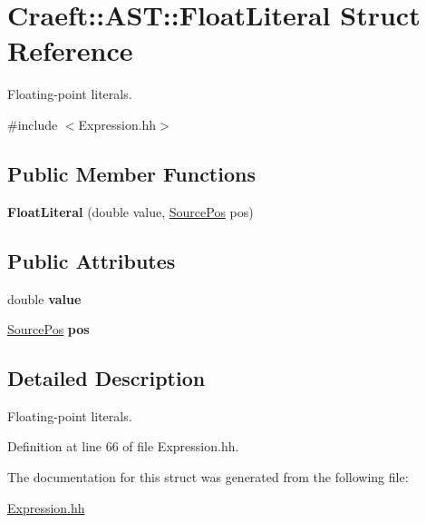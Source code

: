\hypertarget{struct_craeft_1_1_a_s_t_1_1_float_literal}{}\section{Craeft\+:\+:A\+ST\+:\+:Float\+Literal Struct Reference}
\label{struct_craeft_1_1_a_s_t_1_1_float_literal}


Floating-\/point literals.  




{\ttfamily \#include $<$Expression.\+hh$>$}

\subsection*{Public Member Functions}
\begin{DoxyCompactItemize}
\item 
\hypertarget{struct_craeft_1_1_a_s_t_1_1_float_literal_a2148f616f0df8fa9e9f947efc0ea6480}{}\label{struct_craeft_1_1_a_s_t_1_1_float_literal_a2148f616f0df8fa9e9f947efc0ea6480} 
{\bfseries Float\+Literal} (double value, \hyperlink{struct_craeft_1_1_source_pos}{Source\+Pos} pos)
\end{DoxyCompactItemize}
\subsection*{Public Attributes}
\begin{DoxyCompactItemize}
\item 
\hypertarget{struct_craeft_1_1_a_s_t_1_1_float_literal_abfdc3f38d5f64c213ad507d55fee550d}{}\label{struct_craeft_1_1_a_s_t_1_1_float_literal_abfdc3f38d5f64c213ad507d55fee550d} 
double {\bfseries value}
\item 
\hypertarget{struct_craeft_1_1_a_s_t_1_1_float_literal_a221cba0856d46d03f6da874e4a79f679}{}\label{struct_craeft_1_1_a_s_t_1_1_float_literal_a221cba0856d46d03f6da874e4a79f679} 
\hyperlink{struct_craeft_1_1_source_pos}{Source\+Pos} {\bfseries pos}
\end{DoxyCompactItemize}


\subsection{Detailed Description}
Floating-\/point literals. 

Definition at line 66 of file Expression.\+hh.



The documentation for this struct was generated from the following file\+:\begin{DoxyCompactItemize}
\item 
\hyperlink{_expression_8hh}{Expression.\+hh}\end{DoxyCompactItemize}
